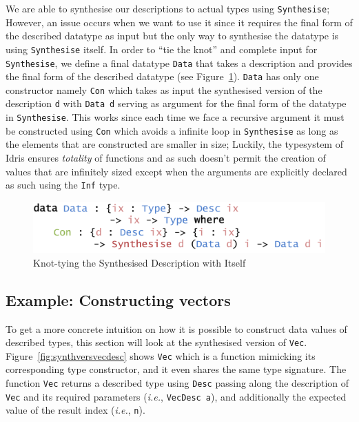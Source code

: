 \documentclass{ituthesis}
\newcommand{\ttconstructor}[1]{\textcolor{constructor-color}{\texttt{#1}}}
\newcommand{\tttype}[1]{\textcolor{type-color}{\texttt{#1}}}
\newcommand{\ttdec}[1]{\textcolor{declared-var-color}{\texttt{#1}}}
\newcommand{\ttvar}[1]{\textcolor{local-var-color}{\texttt{#1}}}
\theoremstyle{definition}
\begin{document}
We are able to synthesise our descriptions to actual types using \ttdec{Synthesise}; However, an issue occurs when we want to use it since it requires the final form of the described datatype as input but the only way to synthesise the datatype is using \ttdec{Synthesise} itself.
In order to ``tie the knot'' and complete input for \ttdec{Synthesise}, we define a final datatype \tttype{Data} that takes a description and provides the final form of the described datatype (see Figure~\ref{fig:datafromdesc}).
\tttype{Data} has only one constructor namely \ttconstructor{Con} which takes as input the synthesised version of the description \ttvar{d} with \tttype{Data}~\ttvar{d} serving as argument for the final form of the datatype in \ttdec{Synthesise}. This works since each time we face a recursive argument it must be constructed using \ttconstructor{Con} which avoids a infinite loop in \ttdec{Synthesise} as long as the elements that are constructed are smaller in size; Luckily, the typesystem of Idris ensures \textit{totality} of functions and as such doesn't permit the creation of values that are infinitely sized except when the arguments are explicitly declared as such using the \tttype{Inf} type.

\begin{figure}[ht]
\begin{center}
    \includegraphics[scale=0.5]{Figures/TyingTheSynthesisKnot.png}
\end{center}
\caption{Knot-tying the Synthesised Description with Itself}
\label{fig:datafromdesc}
\end{figure}

\subsection{Example: Constructing vectors}
\label{sub:Example:Constructing Vectors}

To get a more concrete intuition on how it is possible to construct data values of described types, this section will look at the synthesised version of \tttype{Vec}.
Figure~\ref{fig:synthversvecdesc} shows \ttdec{Vec} which is a function mimicking its corresponding type constructor, and it even shares the same type signature.
The function \ttdec{Vec} returns a described type using \tttype{Desc} passing along the description of \tttype{Vec} and its required parameters (\textit{i.e.}, \ttdec{VecDesc}~\ttvar{a}), 
and additionally the expected value of the result index (\textit{i.e.}, \ttvar{n}).
\end{document}
